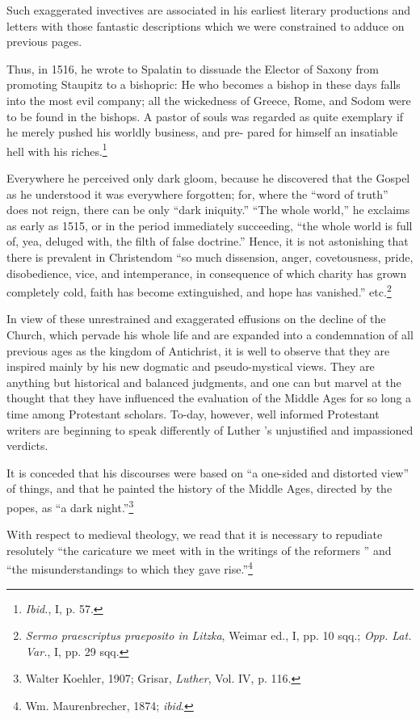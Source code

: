 Such exaggerated invectives are associated in his earliest literary productions
and letters with those fantastic descriptions which we were constrained
to adduce on previous pages.

Thus, in 1516, he wrote to Spalatin to dissuade the Elector of Saxony
from promoting Staupitz to a bishopric: He who becomes a bishop in these
days falls into the most evil company; all the wickedness of Greece, Rome,
and Sodom were to be found in the bishops. A pastor of souls was regarded
as quite exemplary if he merely pushed his worldly business, and pre-
pared for himself an insatiable hell with his riches.\footnote{\textit{Ibid.}, I, p. 57.}

Everywhere he perceived only dark gloom, because he discovered that
the Gospel as he understood it was everywhere forgotten; for, where the
“word of truth” does not reign, there can be only “dark iniquity.” “The
whole world,” he exclaims as early as 1515, or in the period immediately
succeeding, “the whole world is full of, yea, deluged with, the filth of false
doctrine.” Hence, it is not astonishing that there is prevalent in Christendom
“so much dissension, anger, covetousness, pride, disobedience, vice, and
intemperance, in consequence of which charity has grown completely cold,
faith has become extinguished, and hope has vanished.” etc.\footnote
{\textit{Sermo praescriptus praeposito in Litzka}, Weimar ed., I, pp. 10 sqq.; \textit{Opp. Lat. Var.}, I,
pp. 29 sqq.}

In view of these unrestrained and exaggerated effusions on the
decline of the Church, which pervade his whole life and are expanded into
a condemnation of all previous ages as the kingdom
of Antichrist, it is well to observe that they are inspired mainly by
his new dogmatic and pseudo-mystical views. They are anything but
historical and balanced judgments, and one can but marvel at the
thought that they have influenced the evaluation of the Middle
Ages for so long a time among Protestant scholars. To-day, however, well
informed Protestant writers are beginning to speak differently of Luther
’s unjustified and impassioned verdicts.

It is conceded that his discourses were based on “a one-sided and distorted
view” of things, and that he painted the history of the Middle Ages,
directed by the popes, as “a dark night.”\footnote
{Walter Koehler, 1907; Grisar, \textit{Luther}, Vol. IV, p. 116.}

With respect to medieval theology, we read that it is necessary to repudiate
resolutely “the caricature we meet with in the writings of the reformers
” and “the misunderstandings to which they gave rise.”\footnote
{Wm. Maurenbrecher, 1874; \textit{ibid}.}

